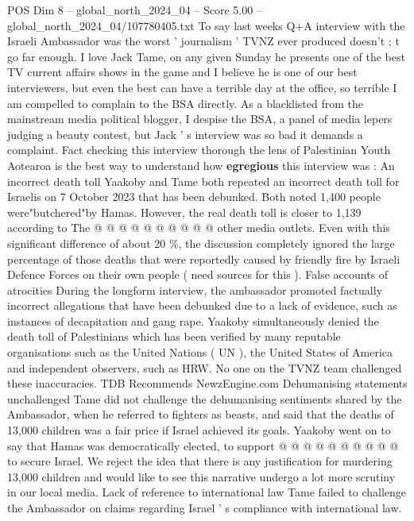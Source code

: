 \begin{textsample}{POS Dim 8 – global\_north\_2024\_04 – Score 5.00 – global\_north\_2024\_04/107780405.txt}  \label{ex:f8_pos_311}
To say last weeks Q+A interview with the Israeli Ambassador was the worst ' journalism ' TVNZ ever produced doesn't ; t go far enough.
I love Jack Tame, on any given Sunday he presents one of the best TV current affairs shows in the game and I believe he is one of our best interviewers, but even the best can have a terrible day at the office, so terrible I am compelled to complain to the BSA directly.
As a blacklisted from the mainstream media political blogger, I despise the BSA, a panel of media lepers judging a beauty contest, but Jack ' s interview was so bad it demands a complaint.
Fact checking this interview thorough the lens of Palestinian Youth Aotearoa is the best way to understand how \textbf{egregious} this interview was : An incorrect death toll Yaakoby and Tame both repeated an incorrect death toll for Israelis on 7 October 2023 that has been debunked.
Both noted 1,400 people were"butchered"by Hamas.
However, the real death toll is closer to 1,139 according to The @ @ @ @ @ @ @ @ @ @ other media outlets.
Even with this significant difference of about 20 \%, the discussion completely ignored the large percentage of those deaths that were reportedly caused by friendly fire by Israeli Defence Forces on their own people ( need sources for this ).
False accounts of atrocities During the longform interview, the ambassador promoted factually incorrect allegations that have been debunked due to a lack of evidence, such as instances of decapitation and gang rape.
Yaakoby simultaneously denied the death toll of Palestinians which has been verified by many reputable organisations such as the United Nations ( UN ), the United States of America and independent observers, such as HRW.
No one on the TVNZ team challenged these inaccuracies.
TDB Recommends NewzEngine.com Dehumanising statements unchallenged Tame did not challenge the dehumanising sentiments shared by the Ambassador, when he referred to fighters as beasts, and said that the deaths of 13,000 children was a fair price if Israel achieved its goals.
Yaakoby went on to say that Hamas was democratically elected, to support @ @ @ @ @ @ @ @ @ @ to secure Israel.
We reject the idea that there is any justification for murdering 13,000 children and would like to see this narrative undergo a lot more scrutiny in our local media.
Lack of reference to international law Tame failed to challenge the Ambassador on claims regarding Israel ' s compliance with international law.

\end{textsample}
